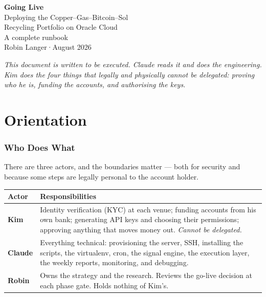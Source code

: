 \documentclass[11pt,a4paper]{article}
\begin{document}
\begin{center}
\vspace*{1.2cm}
{\Huge\bfseries\color{accent} Going Live}\\[1em]
{\LARGE Deploying the Copper--Gas--Bitcoin--Sol\\[0.3em]
Recycling Portfolio on Oracle Cloud}\\[1.8em]
{\large A complete runbook}\\[0.8em]
{\small Robin Langer\quad·\quad August 2026}\\[2.5em]
\begin{minipage}{0.84\textwidth}
\itshape\centering
This document is written to be executed. Claude reads it and does the
engineering. Kim does the four things that legally and physically
cannot be delegated: proving who he is, funding the accounts, and
authorising the keys.
\end{minipage}
\vspace*{1cm}
\end{center}
\thispagestyle{empty}
\newpage

\tableofcontents
\newpage

\part{Orientation}

\section{Who Does What}

There are three actors, and the boundaries matter --- both for security
and because some steps are legally personal to the account holder.

\vspace{0.5em}
\begin{tabular}{@{}p{2.4cm}p{11.5cm}@{}}
    \toprule
    \textbf{Actor} & \textbf{Responsibilities} \\
    \midrule
    \textbf{Kim} &
    Identity verification (KYC) at each venue; funding accounts from his
    own bank; generating API keys and choosing their permissions;
    approving anything that moves money out. \emph{Cannot be delegated.}
    \\[0.4em]
    \textbf{Claude} &
    Everything technical: provisioning the server, SSH, installing the
    scripts, the virtualenv, cron, the signal engine, the execution
    layer, the weekly reports, monitoring, and debugging.
    \\[0.4em]
    \textbf{Robin} &
    Owns the strategy and the research. Reviews the go-live decision at
    each phase gate. Holds nothing of Kim's.
    \\
    \bottomrule
\end{tabular}
\end{document}

